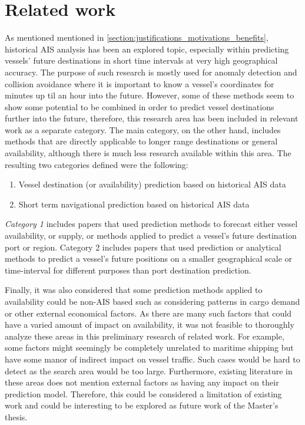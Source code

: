 \chapter{Related work}

As mentioned mentioned in \cref{section:justifications_motivations_benefits}, historical AIS analysis has been an explored topic, especially within predicting vessels’ future destinations in short time intervals at very high geographical accuracy. The purpose of such research is mostly used for anomaly detection and collision avoidance where it is important to know a vessel’s coordinates for minutes up til an hour into the future. However, some of these methods seem to show some potential to be combined in order to predict vessel destinations further into the future, therefore, this research area has been included in relevant work as a separate category. The main category, on the other hand, includes methods that are directly applicable to longer range destinations or general availability, although there is much less research available within this area. The resulting two categories defined were the following:

\begin{enumerate}
    \item Vessel destination (or availability) prediction based on historical AIS data
    \item Short term navigational prediction based on historical AIS data
\end{enumerate}

\textit{Category 1} includes papers that used prediction methods to forecast either vessel availability, or supply, or methods applied to predict a vessel’s future destination port or region. Category 2 includes papers that used prediction or analytical methods to predict a vessel’s future positions on a smaller geographical scale or time-interval for different purposes than port destination prediction.

Finally, it was also considered that some prediction methods applied to availability could be non-AIS based such as considering patterns in cargo demand or other external economical factors. As there are many such factors that could have a varied amount of impact on availability, it was not feasible to thoroughly analyze these areas in this preliminary research of related work. For example, some factors might seemingly be completely unrelated to maritime shipping but have some manor of indirect impact on vessel traffic. Such cases would be hard to detect as the search area would be too large. Furthermore, existing literature in these areas does not mention external factors as having any impact on their prediction model. Therefore, this could be considered a limitation of existing work and could be interesting to be explored as future work of the Master’s thesis.

